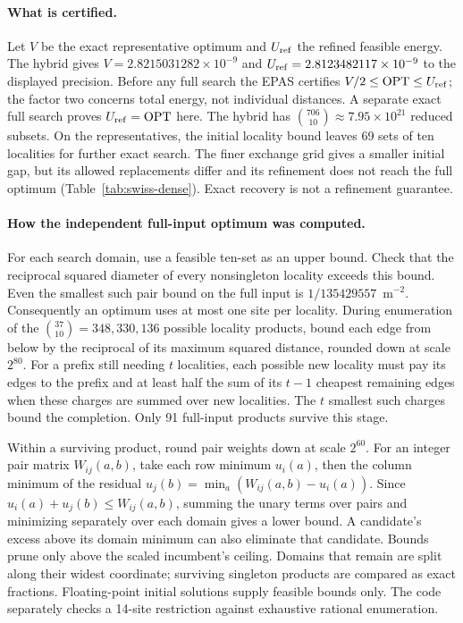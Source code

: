 \documentclass[a4paper,12pt]{article}
\newcommand{\OPT}{\operatorname{OPT}}
\numberwithin{equation}{section}
\begin{document}
\paragraph{What is certified.}
Let $V$ be the exact representative optimum and $U_{\rm ref}$ the refined feasible
energy. The hybrid gives $V=2.8215031282\times10^{-9}$ and
$U_{\rm ref}=2.8123482117\times10^{-9}$ to the displayed precision. Before any
full search the EPAS certifies $V/2\le \OPT\le U_{\rm ref}$; the factor two concerns
total energy, not individual distances. A separate exact full search proves
$U_{\rm ref}=\OPT$ here. The hybrid has $\binom{706}{10}\approx7.95\times10^{21}$ reduced subsets. On the representatives, the initial locality bound leaves 69 sets of ten localities for further exact search. The finer exchange grid gives a smaller initial gap, but
its allowed replacements differ and its refinement does not reach the full optimum
(Table~\ref{tab:swiss-dense}). Exact recovery is not a refinement guarantee.

\paragraph{How the independent full-input optimum was computed.}
For each search domain, use a feasible ten-set as an upper bound. Check that the
reciprocal squared diameter of every nonsingleton locality exceeds this bound.
Even the smallest such pair bound on the full input is $1/135429557$~$\mathrm{m}^{-2}$.
Consequently an optimum uses at most one site per locality. During enumeration of
the $\binom{37}{10}=348{,}330{,}136$ possible locality products, bound each edge
from below by the reciprocal of its maximum squared distance, rounded down at scale
$2^{80}$. For a prefix still needing $t$ localities, each possible new locality
must pay its edges to the prefix and at least half the sum of its $t-1$ cheapest
remaining edges when these charges are summed over new localities. The $t$ smallest
such charges bound the completion. Only 91 full-input products survive this stage.

Within a surviving product, round pair weights down at scale $2^{60}$.
For an integer pair matrix $W_{ij}(a,b)$, take each row minimum
$u_i(a)$, then the column minimum of the residual
$u_j(b)=\min_a(W_{ij}(a,b)-u_i(a))$. Since
$u_i(a)+u_j(b)\le W_{ij}(a,b)$, summing the unary terms over pairs and minimizing
separately over each domain gives a lower bound. A candidate's excess above its
domain minimum can also eliminate that candidate. Bounds prune only above the
scaled incumbent's ceiling. Domains that remain are split along their widest
coordinate; surviving singleton products are compared as exact fractions.
Floating-point initial solutions supply feasible bounds only. The code separately
checks a 14-site restriction against exhaustive rational enumeration.
\end{document}
